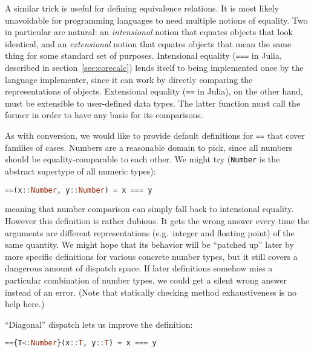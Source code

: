 A similar trick is useful for defining equivalence relations.
It is most likely unavoidable for programming languages to need multiple
notions of equality.
Two in particular are natural: an \emph{intensional}
notion that equates objects that look identical, and an \emph{extensional}
notion that equates objects that mean the same thing for some standard
set of purposes.
Intensional equality (\texttt{===} in Julia, described
in section~\ref{sec:corecalc}) lends itself to being implemented once
by the language implementer, since it can work by directly comparing
the representations of objects.
Extensional equality (\texttt{==} in Julia), on the other hand, must be
extensible to user-defined data types.
The latter function must call the former in order to have any basis for
its comparisons.

As with conversion, we would like to provide default definitions for
\texttt{==} that cover families of cases.
Numbers are a reasonable domain to pick, since all numbers should be
equality-comparable to each other.
We might try (\texttt{Number} is the abstract supertype of all numeric types):

\begin{singlespace}
\begin{lstlisting}[language=julia]
==(x::Number, y::Number) = x === y
\end{lstlisting}
\end{singlespace}

\noindent
meaning that number comparison can simply fall back to intensional
equality.
However this definition is rather dubious.
It gets the wrong answer every time the arguments are different representations
(e.g.\ integer and floating point) of the same quantity.
We might hope that its behavior will be ``patched up'' later by more specific
definitions for various concrete number types, but it still covers a dangerous
amount of dispatch space.
If later definitions somehow miss a particular combination of number types,
we could get a silent wrong answer instead of an error.
(Note that statically checking method exhaustiveness is no help here.)

``Diagonal'' dispatch lets us improve the definition:

\begin{singlespace}
\begin{lstlisting}[language=julia]
=={T<:Number}(x::T, y::T) = x === y
\end{lstlisting}
\end{singlespace}

